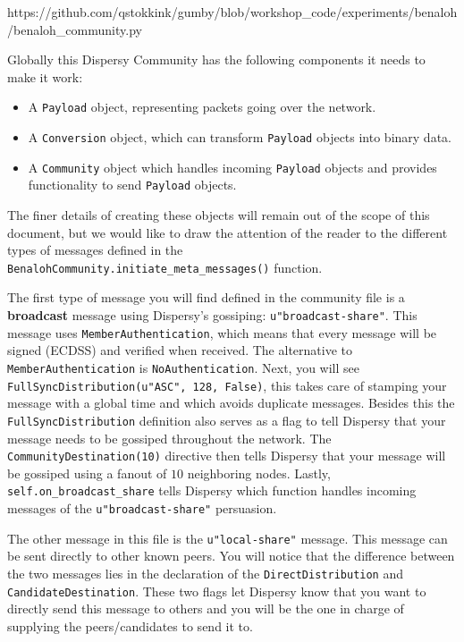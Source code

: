 \documentclass{article}
\begin{document}
https://github.com/qstokkink/gumby/blob/workshop\_code/experiments/benaloh/benaloh\_community.py

\vspace{\baselineskip}
\noindent Globally this Dispersy Community has the following components it needs to make it work:

\begin{itemize}
\item A \texttt{Payload} object, representing packets going over the network.
\item A \texttt{Conversion} object, which can transform \texttt{Payload} objects into binary data.
\item A \texttt{Community} object which handles incoming \texttt{Payload} objects and provides functionality to send \texttt{Payload} objects.
\end{itemize}

\noindent The finer details of creating these objects will remain out of the scope of this document, but we would like to draw the attention of the reader to the different types of messages defined in the \\\texttt{BenalohCommunity.initiate\_meta\_messages()} function.

The first type of message you will find defined in the community file is a \textbf{broadcast} message using Dispersy's gossiping: \texttt{u"broadcast-share"}.
This message uses \texttt{MemberAuthentication}, which means that every message will be signed (ECDSS)  and verified when received.
The alternative to \texttt{MemberAuthentication} is \texttt{NoAuthentication}.
Next, you will see \texttt{FullSyncDistribution(u"ASC", 128, False)}, this takes care of stamping your message with a global time and which avoids duplicate messages.
Besides this the \texttt{FullSyncDistribution} definition also serves as a flag to tell Dispersy that your message needs to be gossiped throughout the network.
The \texttt{CommunityDestination(10)} directive then tells Dispersy that your message will be gossiped using a fanout of $10$ neighboring nodes.
Lastly, \texttt{self.on\_broadcast\_share} tells Dispersy which function handles incoming messages of the \texttt{u"broadcast-share"} persuasion.

The other message in this file is the \texttt{u"local-share"} message.
This message can be sent directly to other known peers.
You will notice that the difference between the two messages lies in the declaration of the \texttt{DirectDistribution} and \texttt{CandidateDestination}.
These two flags let Dispersy know that you want to directly send this message to others and you will be the one in charge of supplying the peers/candidates to send it to.
\end{document}
